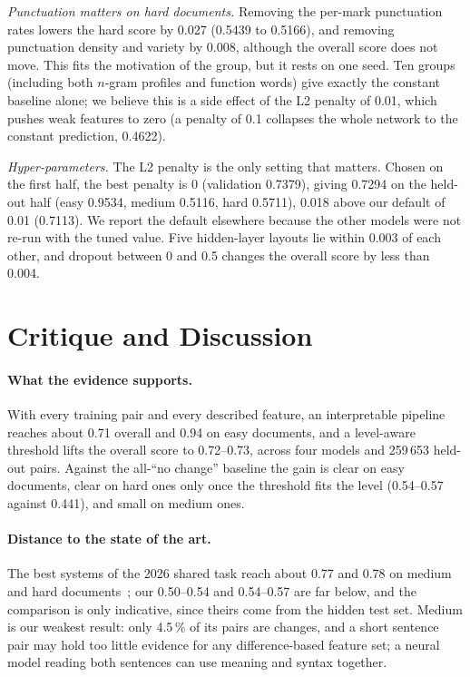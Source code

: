 \documentclass[runningheads]{llncs}
\begin{document}
\emph{Punctuation matters on hard documents.} Removing the per-mark punctuation rates lowers the hard score by 0.027 (0.5439 to 0.5166), and removing punctuation density and variety by 0.008, although the overall score does not move. This fits the motivation of the group, but it rests on one seed. Ten groups (including both $n$-gram profiles and function words) give exactly the constant baseline alone; we believe this is a side effect of the L2 penalty of 0.01, which pushes weak features to zero (a penalty of 0.1 collapses the whole network to the constant prediction, 0.4622).

\emph{Hyper-parameters.} The L2 penalty is the only setting that matters. Chosen on the first half, the best penalty is 0 (validation 0.7379), giving 0.7294 on the held-out half (easy 0.9534, medium 0.5116, hard 0.5711), 0.018 above our default of 0.01 (0.7113). We report the default elsewhere because the other models were not re-run with the tuned value. Five hidden-layer layouts lie within 0.003 of each other, and dropout between 0 and 0.5 changes the overall score by less than 0.004.

\section{Critique and Discussion}
\label{sec:discussion}

\paragraph{What the evidence supports.} With every training pair and every described feature, an interpretable pipeline reaches about 0.71 overall and 0.94 on easy documents, and a level-aware threshold lifts the overall score to 0.72--0.73, across four models and 259\,653 held-out pairs. Against the all-``no change'' baseline the gain is clear on easy documents, clear on hard ones only once the threshold fits the level (0.54--0.57 against 0.441), and small on medium ones.

\paragraph{Distance to the state of the art.} The best systems of the 2026 shared task reach about 0.77 and 0.78 on medium and hard documents~\cite{zangerle:2026}; our 0.50--0.54 and 0.54--0.57 are far below, and the comparison is only indicative, since theirs come from the hidden test set. Medium is our weakest result: only 4.5\,\% of its pairs are changes, and a short sentence pair may hold too little evidence for any difference-based feature set; a neural model reading both sentences can use meaning and syntax together.
\end{document}

